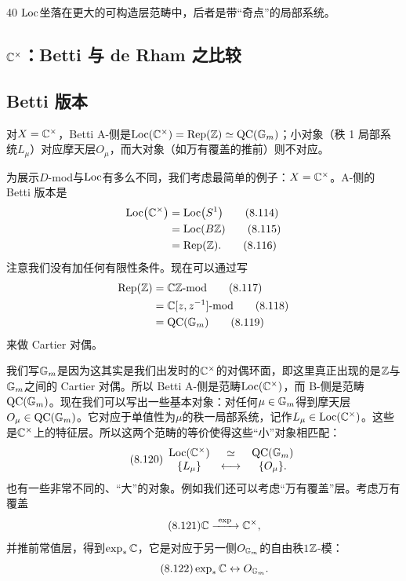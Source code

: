 \begin{srcrem}{40}
$\mathrm{Loc}$坐落在更大的可构造层范畴中，后者是带“奇点”的局部系统。
\end{srcrem}

\subsection{$\mathbb{C}^{\times}$：Betti 与 de Rham 之比较}
\subsection*{Betti 版本}
\begin{sectionkey}
对$X=\mathbb{C}^{\times}$，Betti A-侧是$\mathrm{Loc}(\mathbb{C}^{\times})=\mathrm{Rep}(\mathbb{Z})\simeq\mathrm{QC}(\mathbb{G}_m)$；小对象（秩 1 局部系统$L_\mu$）对应摩天层$O_\mu$，而大对象（如万有覆盖的推前）则不对应。
\end{sectionkey}

为展示$D$-mod与$\mathrm{Loc}$有多么不同，我们考虑最简单的例子：$X=\mathbb{C}^{\times}$。A-侧的 Betti 版本是
\begin{align}
\mathrm{Loc}\bigl(\mathbb{C}^{\times}\bigr)&=\mathrm{Loc}\bigl(S^{1}\bigr)\tag{8.114}\\
&=\mathrm{Loc}(B\mathbb{Z})\tag{8.115}\\
&=\mathrm{Rep}(\mathbb{Z}).\tag{8.116}
\end{align}
注意我们没有加任何有限性条件。现在可以通过写
\begin{align}
\mathrm{Rep}(\mathbb{Z})&=\mathbb{C}\mathbb{Z}\text{-mod}\tag{8.117}\\
&=\mathbb{C}[z,z^{-1}]\text{-mod}\tag{8.118}\\
&=\mathrm{QC}(\mathbb{G}_m)\tag{8.119}
\end{align}
来做 Cartier 对偶。

我们写$\mathbb{G}_m$是因为这其实是我们出发时的$\mathbb{C}^{\times}$的对偶环面，即这里真正出现的是$\mathbb{Z}$与$\mathbb{G}_m$之间的 Cartier 对偶。所以 Betti A-侧是范畴$\mathrm{Loc}(\mathbb{C}^{\times})$，而 B-侧是范畴$\mathrm{QC}(\mathbb{G}_m)$。现在我们可以写出一些基本对象：对任何$\mu\in\mathbb{G}_m$得到摩天层$O_\mu\in\mathrm{QC}(\mathbb{G}_m)$。它对应于单值性为$\mu$的秩一局部系统，记作$L_\mu\in\mathrm{Loc}(\mathbb{C}^{\times})$。这些是$\mathbb{C}^{\times}$上的特征层。所以这两个范畴的等价使得这些“小”对象相匹配：
\begin{equation}\tag{8.120}
\begin{array}{ccc}
\mathrm{Loc}(\mathbb{C}^{\times}) & \simeq & \mathrm{QC}(\mathbb{G}_m)\\
\{L_\mu\} & \longleftrightarrow & \{O_\mu\}.
\end{array}
\end{equation}
也有一些非常不同的、“大”的对象。例如我们还可以考虑“万有覆盖”层。考虑万有覆盖
\begin{equation}\tag{8.121}
\mathbb{C}\xrightarrow{\ \exp\ }\mathbb{C}^{\times},
\end{equation}
并推前常值层，得到$\exp_{*}\mathbb{C}$，它是对应于另一侧$O_{\mathbb{G}_m}$的自由秩$1$$\mathbb{Z}$-模：
\begin{equation}\tag{8.122}
\exp_{*}\mathbb{C}\leftrightarrow O_{\mathbb{G}_m}.
\end{equation}

